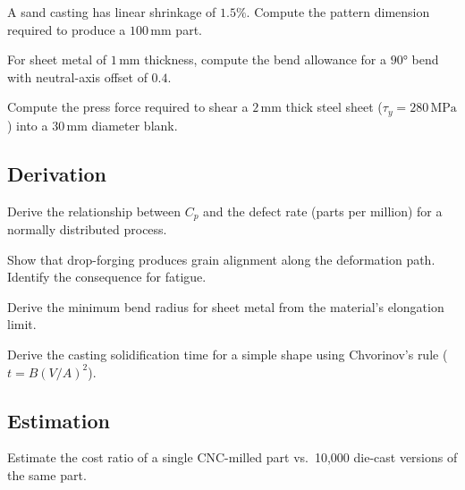 \begin{exercise}
A sand casting has linear shrinkage of $1.5\%$. Compute the pattern dimension required to produce a $100\,\si{\milli\meter}$ part.
\end{exercise}

\begin{exercise}
For sheet metal of $1\,\si{\milli\meter}$ thickness, compute the bend allowance for a $90°$ bend with neutral-axis offset of $0.4$.
\end{exercise}

\begin{exercise}
Compute the press force required to shear a $2\,\si{\milli\meter}$ thick steel sheet ($\tau_y = 280\,\si{\mega\pascal}$) into a $30\,\si{\milli\meter}$ diameter blank.
\end{exercise}

\subsection*{Derivation}

\begin{exercise}
Derive the relationship between $C_p$ and the defect rate (parts per million) for a normally distributed process.
\end{exercise}

\begin{exercise}
Show that drop-forging produces grain alignment along the deformation path. Identify the consequence for fatigue.
\end{exercise}

\begin{exercise}
Derive the minimum bend radius for sheet metal from the material's elongation limit.
\end{exercise}

\begin{exercise}
Derive the casting solidification time for a simple shape using Chvorinov's rule ($t = B(V/A)^2$).
\end{exercise}

\subsection*{Estimation}

\begin{exercise}
Estimate the cost ratio of a single CNC-milled part vs.\ 10,000 die-cast versions of the same part.
\end{exercise}

